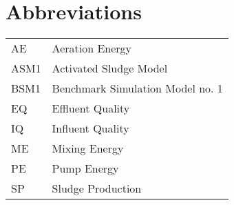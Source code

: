 \section*{Abbreviations}

\begin{center}
    \begin{tabular}{l l}
        AE   & Aeration Energy \\
        ASM1 & Activated Sludge Model \\
        BSM1 & Benchmark Simulation Model no. 1 \\
        EQ   & Effluent Quality \\
        IQ   & Influent Quality \\
        ME   & Mixing Energy \\
        PE   & Pump Energy \\
        SP   & Sludge Production
    \end{tabular}
\end{center}